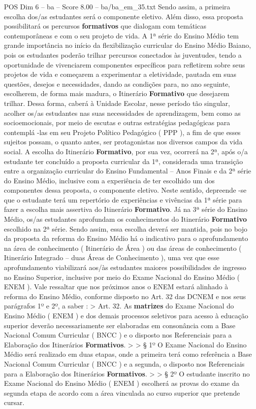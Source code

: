 \begin{textsample}{POS Dim 6 – ba – Score 8.00 – ba/ba\_em\_35.txt}
Sendo assim, a primeira escolha dos/as estudantes será o componente eletivo.
Além disso, essa proposta possibilitará os percursos \textbf{formativos} que dialogam com temáticas contemporâneas e com o seu projeto de vida.
A 1ª série do Ensino Médio tem grande importância no início da flexibilização curricular do Ensino Médio Baiano, pois os estudantes poderão trilhar percursos conectados às juventudes, tendo a oportunidade de vivenciarem componentes específicos para refletirem sobre seus projetos de vida e começarem a experimentar a eletividade, pautada em suas questões, desejos e necessidades, dando as condições para, no ano seguinte, escolherem, de forma mais madura, o Itinerário \textbf{Formativo} que desejarem trilhar.
Dessa forma, caberá à Unidade Escolar, nesse período tão singular, acolher os/as estudantes nas suas necessidades de aprendizagem, bem como as socioemocionais, por meio de escutas e outras estratégias pedagógicas para contemplá -las em seu Projeto Político Pedagógico ( PPP ), a fim de que esses sujeitos possam, o quanto antes, ser protagonistas nos diversos campos da vida social.
A escolha do Itinerário \textbf{Formativo}, por sua vez, ocorrerá na 2ª, após o/a estudante ter concluído a proposta curricular da 1ª, considerada uma transição entre a organização curricular do Ensino Fundamental – Anos Finais e da 2ª série do Ensino Médio, inclusive com a experiência de ter escolhido um dos componentes dessa proposta, o componente eletivo.
Neste sentido, depreende -se que o estudante terá um repertório de experiências e vivências da 1ª série para fazer a escolha mais assertiva do Itinerário \textbf{Formativo}.
Já na 3ª série do Ensino Médio, os/as estudantes aprofundam os conhecimentos do Itinerário \textbf{Formativo} escolhido na 2ª série.
Sendo assim, essa escolha deverá ser mantida, pois no bojo da proposta da reforma do Ensino Médio há o indicativo para o aprofundamento na área de conhecimento ( Itinerário de Área ) ou das áreas de conhecimento ( Itinerário Integrado – duas Áreas de Conhecimento ), uma vez que esse aprofundamento viabilizará aos/às estudantes maiores possibilidades de ingresso no Ensino Superior, inclusive por meio do Exame Nacional do Ensino Médio ( ENEM ).
Vale ressaltar que nos próximos anos o ENEM estará alinhado à reforma do Ensino Médio, conforme disposto no Art. 32 das DCNEM e nos seus parágrafos 1º e 2º, a saber : > Art. 32.
As \textbf{matrizes} do Exame Nacional do Ensino Médio ( ENEM ) e dos demais processos seletivos para acesso à educação superior deverão necessariamente ser elaboradas em consonância com a Base Nacional Comum Curricular ( BNCC ) e o disposto nos Referenciais para a Elaboração dos Itinerários \textbf{Formativos}. > > § 1º O Exame Nacional do Ensino Médio será realizado em duas etapas, onde a primeira terá como referência a Base Nacional Comum Curricular ( BNCC ) e a segunda, o disposto nos Referenciais para a Elaboração dos Itinerários \textbf{Formativos}. > > § 2º O estudante inscrito no Exame Nacional do Ensino Médio ( ENEM ) escolherá as provas do exame da segunda etapa de acordo com a área vinculada ao curso superior que pretende cursar.

\end{textsample}

